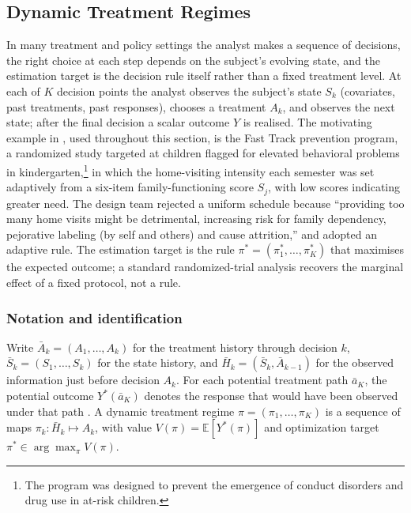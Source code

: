 \subsection{Dynamic Treatment Regimes}
\label{subsec:gmethods_bridge}
\label{subsec:murphy_watkins}

In many treatment and policy settings the analyst makes a sequence of decisions, the right choice at each step depends on the subject's evolving state, and the estimation target is the decision rule itself rather than a fixed treatment level. At each of $K$ decision points the analyst observes the subject's state $S_k$ (covariates, past treatments, past responses), chooses a treatment $A_k$, and observes the next state; after the final decision a scalar outcome $Y$ is realised. The motivating example in \citet{murphy2003dtr}, used throughout this section, is the Fast Track prevention program, a randomized study targeted at children flagged for elevated behavioral problems in kindergarten,\footnote{The program was designed to prevent the emergence of conduct disorders and drug use in at-risk children.} in which the home-visiting intensity each semester was set adaptively from a six-item family-functioning score $S_j$, with low scores indicating greater need. The design team rejected a uniform schedule because ``providing too many home visits might be detrimental, increasing risk for family dependency, pejorative labeling (by self and others) and cause attrition,'' and adopted an adaptive rule. The estimation target is the rule $\pi^* = (\pi_1^*, \ldots, \pi_K^*)$ that maximises the expected outcome; a standard randomized-trial analysis recovers the marginal effect of a fixed protocol, not a rule.

\subsubsection*{Notation and identification}

Write $\bar A_k = (A_1, \ldots, A_k)$ for the treatment history through decision $k$, $\bar S_k = (S_1, \ldots, S_k)$ for the state history, and $\bar H_k = (\bar S_k, \bar A_{k-1})$ for the observed information just before decision $A_k$. For each potential treatment path $\bar a_K$, the potential outcome $Y^*(\bar a_K)$ denotes the response that would have been observed under that path \citep{rubin1978, robins1986}. A dynamic treatment regime $\pi = (\pi_1, \ldots, \pi_K)$ is a sequence of maps $\pi_k : \bar H_k \mapsto A_k$, with value $V(\pi) = \mathbb{E}[Y^*(\pi)]$ and optimization target $\pi^* \in \arg\max_\pi V(\pi)$.

